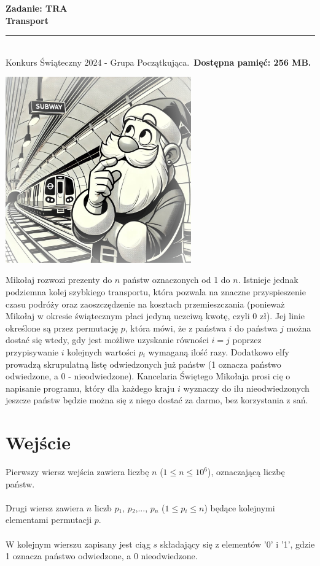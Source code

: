 \documentclass[a4paper,11pt]{article}
\newcommand{\tasktitle}{Transport}
\newcommand{\taskshort}{TRA}
\newcommand{\contestinfo}{Konkurs Świąteczny 2024 - Grupa Początkująca.}
\newcommand{\memorylimit}{256 MB}
\begin{document}
\noindent\textbf{\LARGE Zadanie: \taskshort} \\
\textbf{\Large \tasktitle} \\
\rule{\textwidth}{0.4pt} \\
\small \contestinfo \
\textbf{Dostępna pamięć: \memorylimit.}

\begin{center}
\includegraphics[width=0.6\textwidth]{transport_zdj_1.jpeg} %
\end{center}

\noindent Mikołaj rozwozi prezenty do $n$ państw oznaczonych od 1 do $n$. Istnieje jednak podziemna kolej szybkiego transportu, która pozwala na znaczne przyspieszenie czasu podróży oraz zaoszczędzenie na kosztach przemieszczania (ponieważ Mikołaj w okresie świątecznym płaci jedyną uczciwą kwotę, czyli 0 zł). Jej linie określone są przez permutację $p$, która mówi, że z państwa $i$ do państwa $j$ można dostać się wtedy, gdy jest możliwe uzyskanie równości $i=j$ poprzez przypisywanie $i$ kolejnych wartości $p{_i}$ wymaganą ilość razy. Dodatkowo elfy prowadzą skrupulatną listę odwiedzonych już państw (1 oznacza państwo odwiedzone, a 0 - nieodwiedzone). Kancelaria Świętego Mikołaja prosi cię o napisanie programu, który dla każdego kraju $i$ wyznaczy do ilu nieodwiedzonych jeszcze państw będzie można się z niego dostać za darmo, bez korzystania z sań.

\section*{Wejście}
Pierwszy wiersz wejścia zawiera liczbę $n$ ($1 \leq n \leq 10^6$), oznaczającą liczbę państw.\\\\Drugi wiersz zawiera $n$ liczb $p{_1}$, $p{_2}$,..., $p{_n}$ ($1 \leq p{_i} \leq n$) będące kolejnymi elementami permutacji $p$.\\\\W kolejnym wierszu zapisany jest ciąg $s$ składający się z elementów '0' i '1', gdzie 1 oznacza państwo odwiedzone, a 0 nieodwiedzone.
\end{document}
